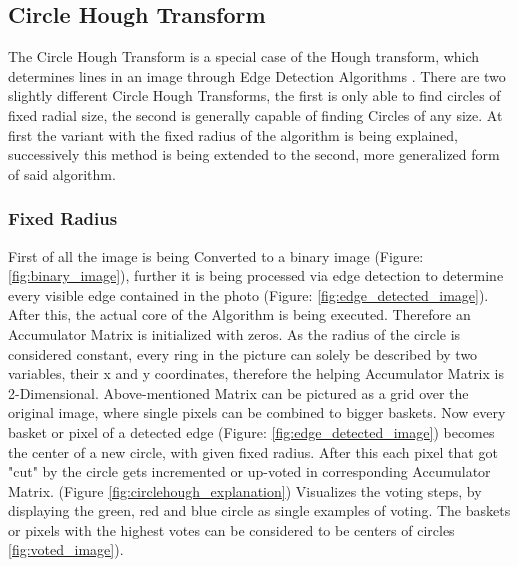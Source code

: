 \subsection{Circle Hough Transform}
The Circle Hough Transform is a special case of the Hough transform, which determines lines in an image through Edge Detection Algorithms \cite{circlehough}. There are two slightly different Circle Hough Transforms, the first is only able to find circles of fixed radial size, the second is generally capable of finding Circles of any size. At first the variant with the fixed radius  of the algorithm is being explained, successively this method is being extended to the second, more generalized form of said algorithm.

\subsubsection{Fixed Radius}
First of all the image is being Converted to a binary image  (Figure: \ref{fig:binary_image}), further it is being processed via edge detection to determine every visible edge contained in the photo (Figure: \ref{fig:edge_detected_image}).
After this, the actual core of the Algorithm is being executed. Therefore an Accumulator Matrix is initialized with zeros. As the radius of the circle is considered constant, every ring in the picture can solely be described by two variables, their x and y coordinates, therefore the helping Accumulator Matrix is 2-Dimensional.
Above-mentioned Matrix can be pictured as a grid over the original image, where single pixels can be combined to bigger baskets. Now every basket or pixel of a detected edge (Figure: \ref{fig:edge_detected_image}) becomes the center of a new circle, with given fixed radius. After this each pixel that got "cut" by the circle gets incremented or up-voted in corresponding Accumulator Matrix. (Figure \ref{fig:circlehough_explanation}) Visualizes the voting steps, by displaying the green, red and blue circle as single examples of voting. The baskets or pixels with the highest votes can be considered to be centers of circles \ref{fig:voted_image}).
\newline

